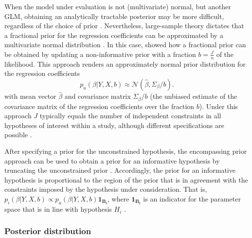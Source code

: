 \documentclass[review, 3p, authoryear]{elsarticle} %
\begin{document}
When the model under evaluation is not (multivariate) normal, but another GLM, obtaining an analytically tractable posterior may be more difficult, regardless of the choice of prior \citep{bda2013}.
Nevertheless, large-sample theory dictates that a fractional prior for the regression coefficients can be approximated by a multivariate normal distribution \citep{bda2013}.
In this case, \citet{gu_approximated_2018} showed how a fractional prior can be obtained by updating a non-informative prior with a fraction \(b = \frac{J}{n}\) of the likelihood.
This approach renders an approximately normal prior distribution for the regression coefficients
\[
p_u(\beta | Y, X, b) \approx \mathcal{N}(\hat{\beta}, \Sigma_\beta / b).
\]
with mean vector \(\hat{\beta}\) and covariance matrix \(\Sigma_{\beta}/b\) (the unbiased estimate of the covariance matrix of the regression coefficients over the fraction \(b\)).
Under this approach \(J\) typically equals the number of independent constraints in all hypotheses of interest within a study, although different specifications are possible \citep[for an elaborate discussion on appropriate values for \(J\), see][]{gu_approximated_2018, hoijtink_prior_2021}.

After specifying a prior for the unconstrained hypothesis, the encompassing prior approach can be used to obtain a prior for an informative hypothesis by truncating the unconstrained prior \citep[e.g.,][]{klugkist_inequality_2005, mulder_equality_2010, mulder_prior_2014}.
Accordingly, the prior for an informative hypothesis is proportional to the region of the prior that is in agreement with the constraints imposed by the hypothesis under consideration.
That is, \(p_i(\beta | Y, X, b) \propto p_u(\beta | Y, X, b)\boldsymbol{1}_{\boldsymbol{B_i}}\), where \(\boldsymbol{1}_{\boldsymbol{B_i}}\) is an indicator for the parameter space that is in line with hypothesis \(H_i\) \citep{gu_approximated_2018}.

\hypertarget{posterior-distribution}{%
\subsubsection{Posterior distribution}\label{posterior-distribution}}
\end{document}
